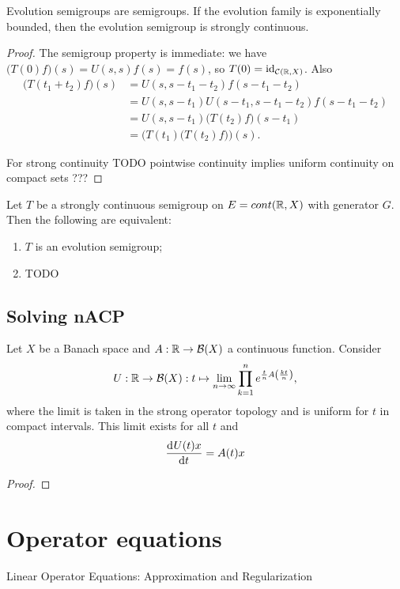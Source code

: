 \begin{lemma}
Evolution semigroups are semigroups. If the evolution family is exponentially bounded, then the evolution semigroup is strongly continuous.
\end{lemma}
\begin{proof}
The semigroup property is immediate: we have $\big(T(0)f\big)(s) = U(s,s)f(s) = f(s)$, so $T(0) = \operatorname{id}_{\operatorname{\mathcal{C}}(\mathbb{R},X)}$. Also
\begin{align*}
\big(T(t_1+t_2)f\big)(s) &= U(s,s-t_1-t_2)f(s-t_1-t_2) \\
&= U(s,s-t_1)U(s-t_1,s-t_1-t_2)f(s-t_1-t_2) \\
&= U(s,s-t_1)\big(T(t_2)f\big)(s-t_1) \\
&= \Big(T(t_1)\big(T(t_2)f\big)\Big)(s).
\end{align*}


For strong continuity TODO pointwise continuity implies uniform continuity on compact sets ???
\end{proof}

\begin{proposition}
Let $T$ be a strongly continuous semigroup on $E = cont(\mathbb{R},X)$ with generator $G$. Then the following are equivalent:
\begin{enumerate}
\item $T$ is an evolution semigroup;
\item TODO
\end{enumerate}
\end{proposition}

\section{Solving nACP}
\begin{proposition}
Let $X$ be a Banach space and $A: \mathbb{R}\to \operatorname{\mathcal{B}}(X)$ a continuous function. Consider
\[ U: \mathbb{R}\to \operatorname{\mathcal{B}}(X): t\mapsto \lim_{n\to\infty}\prod_{k=1}^ne^{\frac{t}{n}A\left(\frac{kt}{n}\right)}, \]
where the limit is taken in the strong operator topology and is uniform for $t$ in compact intervals. This limit exists for all $t$ and
\[ \mathinner{ \dfrac{\operatorname{d \!}{^{}}U(t)x}{\operatorname{d \!}{{t}^{}}} } = A(t)x \]
\end{proposition}
\begin{proof}

\end{proof}

\chapter{Operator equations}
Linear Operator Equations: Approximation and Regularization
